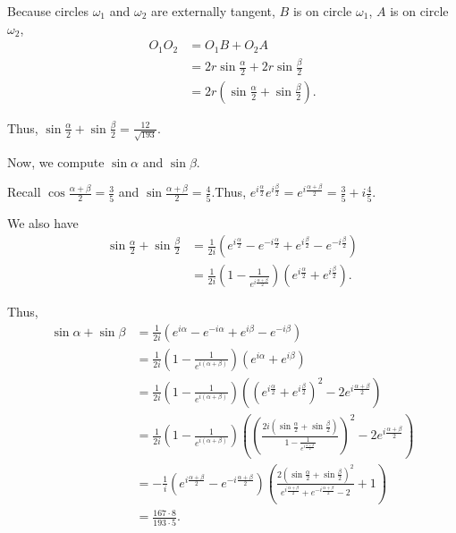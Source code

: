 \begin{enumerate}
 Because circles $\omega_1$ and $\omega_2$ are externally tangent, $B$ is on circle $\omega_1$, $A$ is on circle $\omega_2$,
 \begin{align*} O_1 O_2 & = O_1 B + O_2 A \\ & = 2 r \sin \frac{\alpha}{2} + 2 r \sin \frac{\beta}{2} \\ & = 2 r \left( \sin \frac{\alpha}{2} + \sin \frac{\beta}{2} \right) .   \end{align*}


 Thus, $\sin \frac{\alpha}{2} + \sin \frac{\beta}{2} = \frac{12}{\sqrt{193}}$.

 Now, we compute $\sin \alpha$ and $\sin \beta$.

 Recall $\cos \frac{\alpha + \beta}{2} = \frac{3}{5}$ and $\sin \frac{\alpha + \beta}{2} = \frac{4}{5}$.Thus, $e^{i \frac{\alpha}{2}} e^{i \frac{\beta}{2}} = e^{i \frac{\alpha + \beta}{2}} =  \frac{3}{5} + i \frac{4}{5}$.

 We also have
 \begin{align*} \sin \frac{\alpha}{2} + \sin \frac{\beta}{2} & = \frac{1}{2i} \left( e^{i \frac{\alpha}{2}} - e^{-i \frac{\alpha}{2}}  + e^{i \frac{\beta}{2}} - e^{-i \frac{\beta}{2}}  \right) \\ & = \frac{1}{2i} \left( 1 - \frac{1}{e^{i \frac{\alpha + \beta}{2}} } \right) \left( e^{i \frac{\alpha}{2}} + e^{i \frac{\beta}{2}} \right) .   \end{align*}


 Thus,
 \begin{align*} \sin \alpha + \sin \beta  & = \frac{1}{2i} \left( e^{i \alpha} - e^{-i \alpha} + e^{i \beta} - e^{-i \beta}  \right) \\ & = \frac{1}{2i} \left( 1 - \frac{1}{e^{i \left( \alpha + \beta \right)}} \right) \left( e^{i \alpha} + e^{i \beta} \right) \\ & = \frac{1}{2i} \left( 1 - \frac{1}{e^{i \left( \alpha + \beta \right)}}  \right) \left( \left( e^{i \frac{\alpha}{2}} + e^{i \frac{\beta}{2}} \right)^2 - 2 e^{i \frac{\alpha + \beta}{2}} \right) \\ & = \frac{1}{2i} \left( 1 - \frac{1}{e^{i \left( \alpha + \beta \right)}}  \right) \left( \left(  \frac{2 i \left( \sin \frac{\alpha}{2} + \sin \frac{\beta}{2} \right)}{1 - \frac{1}{e^{i \frac{\alpha + \beta}{2}} }} \right)^2 - 2 e^{i \frac{\alpha + \beta}{2}} \right) \\ & = - \frac{1}{i} \left( e^{i \frac{\alpha + \beta}{2}} - e^{-i \frac{\alpha + \beta}{2}} \right) \left( \frac{2 \left( \sin \frac{\alpha}{2} + \sin \frac{\beta}{2} \right)^2} {e^{i \frac{\alpha + \beta}{2}} + e^{-i \frac{\alpha + \beta}{2}} - 2 } + 1 \right) \\ & = \frac{167 \cdot 8}{193 \cdot 5 } . \end{align*}



\end{enumerate}
